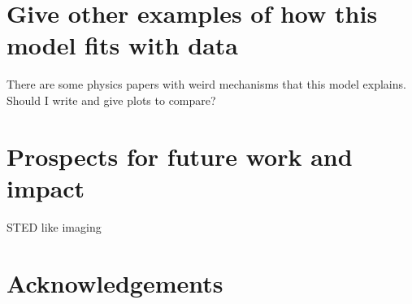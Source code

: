 \documentclass[preprint,prl]{revtex4}
\begin{document}
\section{Give other examples of how this model fits with data}
There are some physics papers with weird mechanisms that this model explains. Should I write and give plots to compare?


\section{Prospects for future work and impact}
STED like imaging


\section{}


































 






%


\section*{Acknowledgements}
\end{document}
